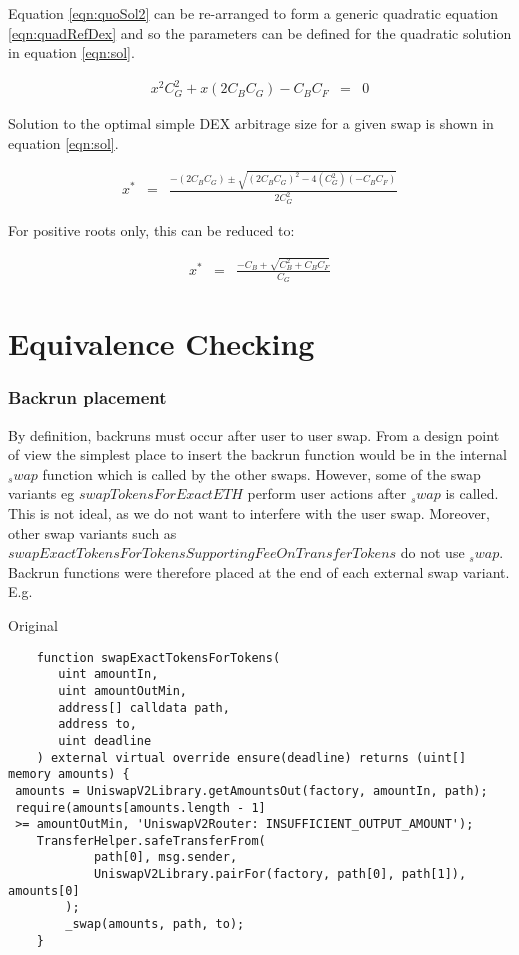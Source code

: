 \documentclass[runningheads]{llncs}
\begin{document}
	Equation \ref{eqn:quoSol2} can be re-arranged to form a generic quadratic equation \ref{eqn:quadRefDex} and so the parameters can be defined for the quadratic solution in equation \ref{eqn:sol}.
	
	\begin{eqnarray}
		x^2 C_{G}^2 + x(2 C_{B} C_{G}) - C_{B} C_{F} &=& 0 \label{eqn:quadRefDex}
	\end{eqnarray}
	
	Solution to the optimal simple DEX arbitrage size for a given swap is shown in equation \ref{eqn:sol}.
	
	\begin{eqnarray}
		x^* &=& \frac{-(2 C_{B} C_{G}) \pm \sqrt{(2 C_{B} C_{G})^2 - 4(C_{G}^2)(- C_{B} C_{F})}}{2 C_{G}^2} \label{eqn:sol}
	\end{eqnarray}
	
	For positive roots only, this can be reduced to:
	
	\begin{eqnarray}
		x^* &=& \frac{- C_{B} + \sqrt{C_{B} ^2 + C_{B} C_{F}}}{C_{G}} \label{eqn:sol2}
	\end{eqnarray}
	

\chapter{Equivalence Checking}

\subsection{Backrun placement}

By definition, backruns must occur after user to user swap. From a design point of view the simplest place to insert the backrun function would be in the internal $_swap$ function which is called by the other swaps. However, some of the swap variants eg $swapTokensForExactETH$ perform user actions after $_swap$ is called. This is not ideal, as we do not want to interfere with the user swap. Moreover, other swap variants such as $swapExactTokensForTokensSupportingFeeOnTransferTokens$ do not use $_swap$. Backrun functions were therefore placed at the end of each external swap variant. E.g.

Original
\label{Before swapExactTokensforTokens:1}
\begin{verbatim}
    function swapExactTokensForTokens(
       uint amountIn,
       uint amountOutMin,
       address[] calldata path,
       address to,
       uint deadline
    ) external virtual override ensure(deadline) returns (uint[] memory amounts) {
 amounts = UniswapV2Library.getAmountsOut(factory, amountIn, path);
 require(amounts[amounts.length - 1] 
 >= amountOutMin, 'UniswapV2Router: INSUFFICIENT_OUTPUT_AMOUNT');
    TransferHelper.safeTransferFrom(
            path[0], msg.sender, 
            UniswapV2Library.pairFor(factory, path[0], path[1]), amounts[0]
        );
        _swap(amounts, path, to);
    }
\end{verbatim}
\end{document}
